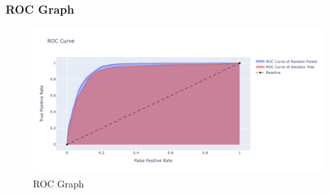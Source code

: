 \documentclass[11pt,a4paper]{article}
\begin{document}
    
    \subsubsection{ROC Graph}
    


    
    \begin{figure}[H]
        \centering
        \includegraphics[width = \textwidth]{plot/classification/roc.pdf}
        \caption{ROC Graph}
        \label{fig:roc}
    \end{figure}

    
    
\end{document}
